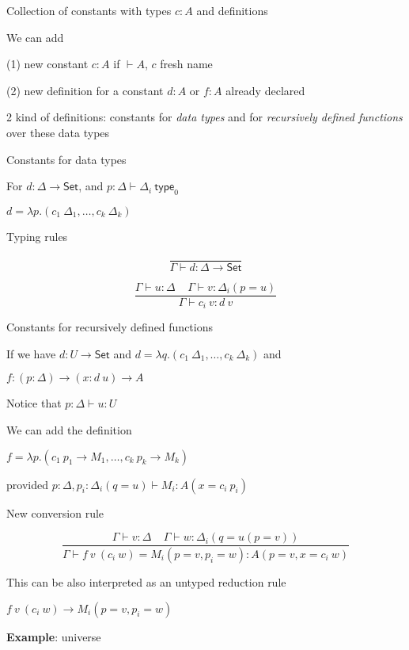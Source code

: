 \documentclass[25pt,dvips,fleqn]{foils}
\newcommand\Set{\mathsf{Set}}
\newcommand\type{\mathsf{type}}
\begin{document}

 Collection of constants with types $c:A$ and definitions

 We can add

 (1) new constant $c:A$ if $\vdash A$, $c$ fresh name

 (2) new definition for a constant $d:A$ or $f:A$ already declared


 2 kind of definitions: constants for {\em data types} and for 
{\em recursively defined functions} over these data types


 Constants for data types

 For $d:\Delta\rightarrow\Set$, and $p:\Delta\vdash \Delta_i~\type _0$

 $d = \lambda p.(c_1~\Delta_1,\dots,c_k~\Delta_k)$

 Typing rules

 $$\frac{}{\Gamma\vdash d:\Delta\rightarrow\Set}$$

 $$\frac{\Gamma\vdash u:\Delta~~~~~\Gamma\vdash v:\Delta_i(p=u)}{\Gamma\vdash c_i~v:d~v}$$




 Constants for recursively defined functions

 If we have $d:U\rightarrow\Set$ 
and $d =  \lambda q.(c_1~\Delta_1,\dots,c_k~\Delta_k)$ and

 $f:(p:\Delta)\rightarrow (x:d~u)\rightarrow A$ 

 Notice that $p:\Delta\vdash u:U$

 We can add the definition

 $f = \lambda p.(c_1~p_1\rightarrow M_1,\dots,c_k~p_k\rightarrow M_k)$

provided $p:\Delta,p_i:\Delta_i(q=u)\vdash M_i:A(x=c_i~p_i)$


 New conversion rule

 $$\frac{\Gamma\vdash v:\Delta~~~~~\Gamma\vdash w:\Delta_i(q=u(p=v))}
        {\Gamma\vdash f~v~(c_i~w) = M_i(p=v,p_i=w):A(p=v,x=c_i~w)}$$

 This can be also interpreted as an untyped reduction rule

 $f~v~(c_i~w)\rightarrow M_i(p=v,p_i=w)$


 {\bf Example}: universe
\end{document}
